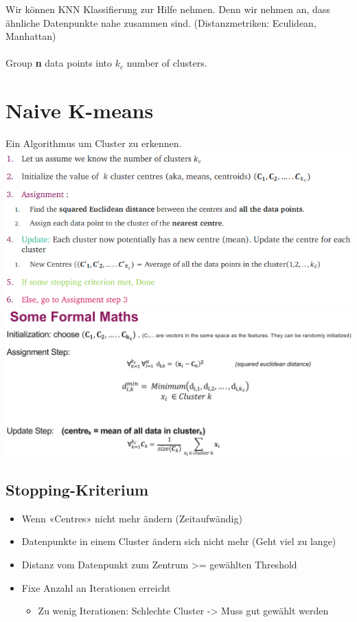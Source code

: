 Wir können KNN Klassifierung zur Hilfe nehmen. Denn wir nehmen an, dass ähnliche Datenpunkte nahe zusammen sind. (Distanzmetriken: Eculidean, Manhattan)\\
\\
Group \textbf{n} data points into $k_c$ number of clusters.
\section{Naive K-means}
Ein Algorithmus um Cluster zu erkennen.
\includegraphics[width=\linewidth]{img/clustering_naive_k-means.png}
\includegraphics[width=\linewidth]{img/k-means_math.png}
\subsection{Stopping-Kriterium}
\begin{itemize}
\item Wenn «Centres» nicht mehr ändern (Zeitaufwändig)
\item Datenpunkte in einem Cluster ändern sich nicht mehr (Geht viel zu lange)
\item Distanz vom Datenpunkt zum Zentrum >= gewählten Threshold
\item Fixe Anzahl an Iterationen erreicht
\begin{itemize}
\item Zu wenig Iterationen: Schlechte Cluster -> Muss gut gewählt werden
\end{itemize}
\end{itemize}
